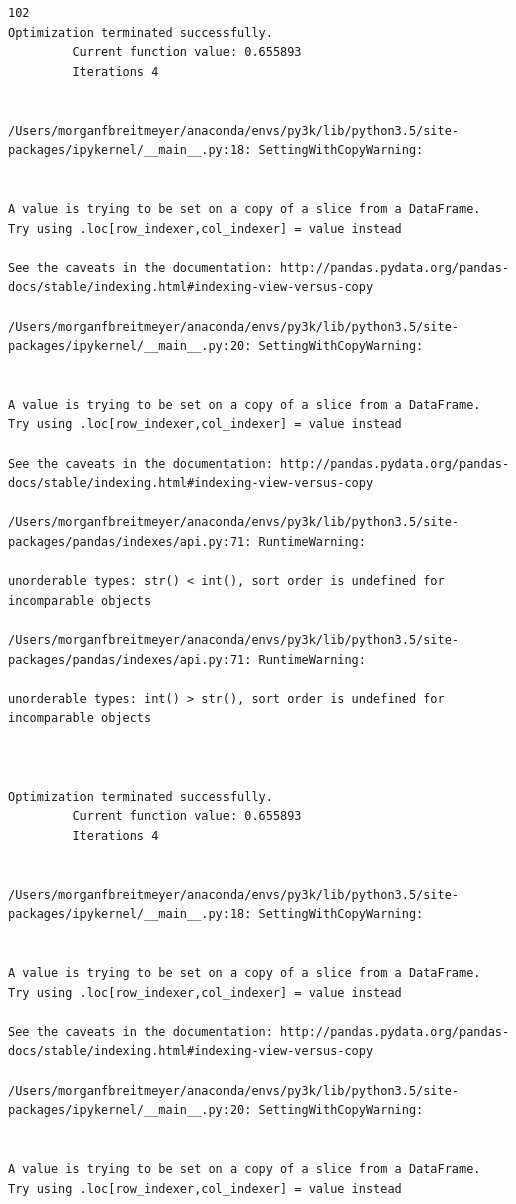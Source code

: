 \begin{lstlisting}
102
Optimization terminated successfully.
         Current function value: 0.655893
         Iterations 4


/Users/morganfbreitmeyer/anaconda/envs/py3k/lib/python3.5/site-packages/ipykernel/__main__.py:18: SettingWithCopyWarning:


A value is trying to be set on a copy of a slice from a DataFrame.
Try using .loc[row_indexer,col_indexer] = value instead

See the caveats in the documentation: http://pandas.pydata.org/pandas-docs/stable/indexing.html#indexing-view-versus-copy

/Users/morganfbreitmeyer/anaconda/envs/py3k/lib/python3.5/site-packages/ipykernel/__main__.py:20: SettingWithCopyWarning:


A value is trying to be set on a copy of a slice from a DataFrame.
Try using .loc[row_indexer,col_indexer] = value instead

See the caveats in the documentation: http://pandas.pydata.org/pandas-docs/stable/indexing.html#indexing-view-versus-copy

/Users/morganfbreitmeyer/anaconda/envs/py3k/lib/python3.5/site-packages/pandas/indexes/api.py:71: RuntimeWarning:

unorderable types: str() < int(), sort order is undefined for incomparable objects

/Users/morganfbreitmeyer/anaconda/envs/py3k/lib/python3.5/site-packages/pandas/indexes/api.py:71: RuntimeWarning:

unorderable types: int() > str(), sort order is undefined for incomparable objects



Optimization terminated successfully.
         Current function value: 0.655893
         Iterations 4


/Users/morganfbreitmeyer/anaconda/envs/py3k/lib/python3.5/site-packages/ipykernel/__main__.py:18: SettingWithCopyWarning:


A value is trying to be set on a copy of a slice from a DataFrame.
Try using .loc[row_indexer,col_indexer] = value instead

See the caveats in the documentation: http://pandas.pydata.org/pandas-docs/stable/indexing.html#indexing-view-versus-copy

/Users/morganfbreitmeyer/anaconda/envs/py3k/lib/python3.5/site-packages/ipykernel/__main__.py:20: SettingWithCopyWarning:


A value is trying to be set on a copy of a slice from a DataFrame.
Try using .loc[row_indexer,col_indexer] = value instead


\end{lstlisting}
